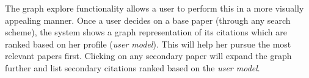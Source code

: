 The graph explore functionality allows a user to perform this in a more visually appealing manner.
Once a user decides on a base paper (through any search scheme), the system shows a graph representation of its citations which are ranked based on her profile (\textsl{user model}).
This will help her pursue the most relevant papers first.
Clicking on any secondary paper will expand the graph further and 
list secondary citations ranked based on the \textsl{user model}.

